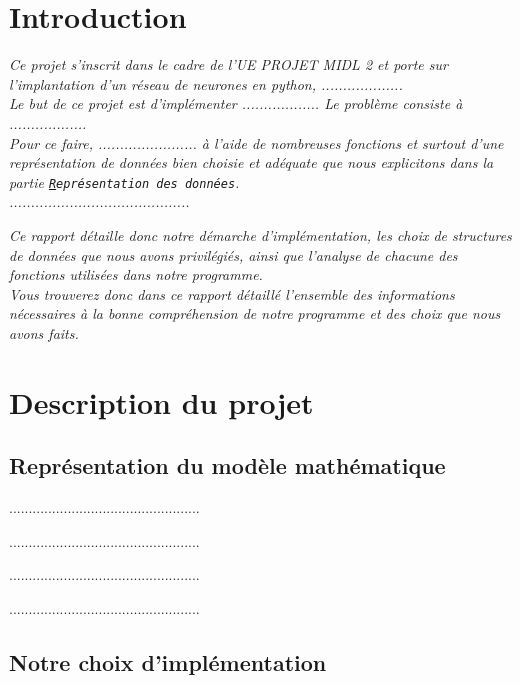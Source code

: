 \documentclass[12pt,a4paper]{article}
\begin{document}
\newpage
\tableofcontents
\newpage

\section{\huge{Introduction}}
\textit{Ce projet s'inscrit dans le cadre de l'UE PROJET MIDL 2 et porte sur l'implantation d'un réseau de neurones en python, ...................}\\

\textit{Le but de ce projet est d'implémenter .................. Le problème consiste à ..................}\\

\textit{Pour ce faire, ....................... à l'aide de nombreuses fonctions et surtout d'une représentation de données bien choisie et adéquate que nous explicitons dans la partie \texttt{\hyperlink{representation}Représentation des données}.}\\

\textit{..........................................}

\textit{Ce rapport détaille donc notre démarche d'implémentation, les choix de structures de données que nous avons privilégiés, ainsi que l'analyse de chacune des fonctions utilisées dans notre programme.}\\

\textit{Vous trouverez donc dans ce rapport détaillé l'ensemble des informations nécessaires à la bonne compréhension de notre programme et des choix que nous avons faits.}

\section{\huge{Description du projet}}

\subsection{Représentation du modèle mathématique}
\label{sec:representation}

.................................................

.................................................

.................................................

.................................................


\subsection{Notre choix d'implémentation}
\end{document}
